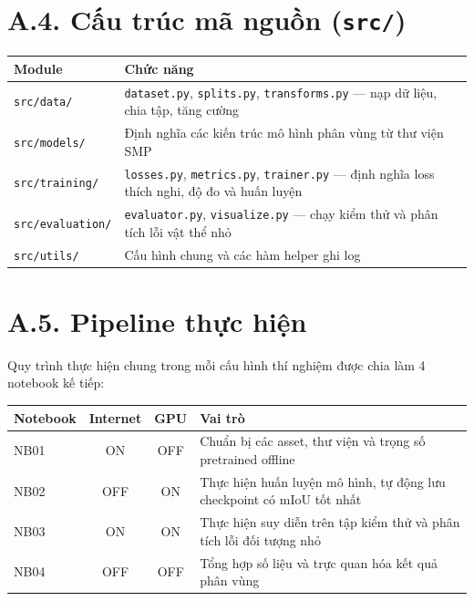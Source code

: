 \section*{A.4. Cấu trúc mã nguồn (\texttt{src/})}
\begin{center}
\small
\begin{tabular}{l l}
\toprule
\textbf{Module} & \textbf{Chức năng} \\
\midrule
\texttt{src/data/}       & \texttt{dataset.py}, \texttt{splits.py}, \texttt{transforms.py} --- nạp dữ liệu, chia tập, tăng cường \\
\texttt{src/models/}     & Định nghĩa các kiến trúc mô hình phân vùng từ thư viện SMP \\
\texttt{src/training/}   & \texttt{losses.py}, \texttt{metrics.py}, \texttt{trainer.py} --- định nghĩa loss thích nghi, độ đo và huấn luyện \\
\texttt{src/evaluation/} & \texttt{evaluator.py}, \texttt{visualize.py} --- chạy kiểm thử và phân tích lỗi vật thể nhỏ \\
\texttt{src/utils/}      & Cấu hình chung và các hàm helper ghi log \\
\bottomrule
\end{tabular}
\end{center}

\section*{A.5. Pipeline thực hiện}
Quy trình thực hiện chung trong mỗi cấu hình thí nghiệm được chia làm 4 notebook kế tiếp:
\begin{center}
\small
\begin{tabular}{l c c l}
\toprule
\textbf{Notebook} & \textbf{Internet} & \textbf{GPU} & \textbf{Vai trò} \\
\midrule
NB01 & ON  & OFF & Chuẩn bị các asset, thư viện và trọng số pretrained offline \\
NB02 & OFF & ON  & Thực hiện huấn luyện mô hình, tự động lưu checkpoint có mIoU tốt nhất \\
NB03 & ON  & ON  & Thực hiện suy diễn trên tập kiểm thử và phân tích lỗi đối tượng nhỏ \\
NB04 & OFF & OFF & Tổng hợp số liệu và trực quan hóa kết quả phân vùng \\
\bottomrule
\end{tabular}
\end{center}
